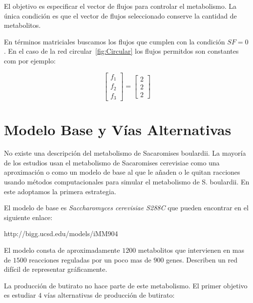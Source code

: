 \documentclass[12pt,spanish]{article}
\begin{document}
El objetivo es especificar el vector de flujos para controlar el metabolismo. La única condición es que el vector de flujos seleccionado conserve la cantidad de metabolitos.

En términos matriciales buscamos los flujos que cumplen con la condición $SF = 0$. En el caso de la red circular~\ref{fig:Circular} los flujos permitdos son constantes com por ejemplo:

\begin{equation*}
  \begin{bmatrix}
     f_1\\
     f_2\\
     f_3
  \end{bmatrix} =
  \begin{bmatrix}
     2\\
     2\\
     2
  \end{bmatrix}
\end{equation*}



\section{Modelo Base y Vías Alternativas}

No existe una descripción del metabolismo de Sacaromises boulardii. La mayoría de los estudios usan el metabolismo de Sacaromises cerevisiae como una aproximación o como un modelo de base al que le añaden o le quitan racciones usando métodos computacionales para simular el metabolismo de S. boulardii. En este adoptamos la primera estrategia.

\par
El modelo de base es \emph{Saccharomyces cerevisiae S288C} que pueden encontrar en el siguiente enlace:

\begin{center}
  http://bigg.ucsd.edu/models/iMM904
\end{center}

\par
El modelo consta de aproximadamente $1200$ metabolitos que intervienen en mas de $1500$ reacciones reguladas por un poco mas de $900$ genes. Describen un red difícil de representar gráficamente.

\par

La producción de butirato no hace parte de este metabolismo. El primer objetivo es estudiar $4$ vías alternativas de producción de butirato:
\end{document}
